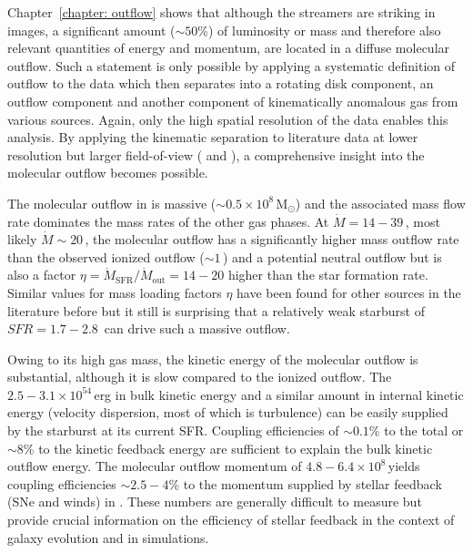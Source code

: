 Chapter~\ref{chapter: outflow} shows that although the streamers are striking in images, a significant amount ($\sim 50$\%) of luminosity or mass and therefore also relevant quantities of energy and momentum, are located in a diffuse molecular outflow.
Such a statement is only possible by applying a systematic definition of outflow to the data which then separates into a rotating disk component, an outflow component and another component of kinematically anomalous gas from various sources. Again, only the high spatial resolution of the  data enables this analysis.
By applying the kinematic separation to literature data at lower resolution but larger field-of-view ( and ), a comprehensive insight into the molecular outflow becomes possible.

The molecular outflow in  is massive ($\sim 0.5 \times 10^8$\,M$_\odot$) and the associated mass flow rate dominates the mass rates of the other gas phases. At $\dot{M} = 14-39$\,\Msunyr, most likely $\dot{M} \sim 20$\,\Msunyr, the molecular outflow has a significantly higher mass outflow rate than the observed ionized outflow ($\sim 1$\,\Msunyr) and a potential neutral outflow but is also a factor $\eta=\dot{M}_\mathrm{SFR}/\dot{M}_\mathrm{out} = 14-20$ higher than the star formation rate. 
Similar values for mass loading factors $\eta$ have been found for other sources in the literature before but it still is surprising that a relatively weak starburst of $SFR = 1.7-2.8$\,\Msunyr \citep{Ott:2005il,Leroy:2015ds,2015MNRAS.450L..80B} can drive such a massive outflow.

Owing to its high gas mass, the kinetic energy of the molecular outflow is substantial, although it is slow compared to the ionized outflow. The $2.5-3.1 \times 10^{54}$\,erg in bulk kinetic energy and a similar amount in internal kinetic energy (velocity dispersion, most of which is turbulence) can be easily supplied by the starburst at its current SFR. Coupling efficiencies of $\sim 0.1$\% to the total or $\sim 8$\% to the kinetic feedback energy are sufficient to explain the bulk kinetic outflow energy.
The molecular outflow momentum of $4.8-6.4 \times 10^8$\,\Msunkms yields coupling efficiencies $\sim 2.5-4$\% to the momentum supplied by stellar feedback (SNe and winds) in .
These numbers are generally difficult to measure but provide crucial information on the efficiency of stellar feedback in the context of galaxy evolution and in simulations.

